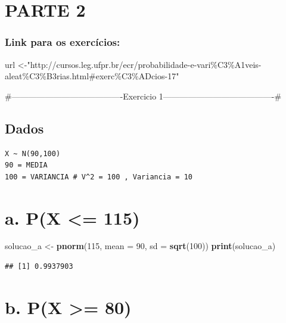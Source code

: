 \documentclass[
]{article}
\newenvironment{Shaded}{\begin{snugshade}}{\end{snugshade}}
\newcommand{\AttributeTok}[1]{\textcolor[rgb]{0.13,0.29,0.53}{#1}}
\newcommand{\DecValTok}[1]{\textcolor[rgb]{0.00,0.00,0.81}{#1}}
\newcommand{\FunctionTok}[1]{\textcolor[rgb]{0.13,0.29,0.53}{\textbf{#1}}}
\newcommand{\NormalTok}[1]{#1}
\newcommand{\OtherTok}[1]{\textcolor[rgb]{0.56,0.35,0.01}{#1}}
\newcommand{\StringTok}[1]{\textcolor[rgb]{0.31,0.60,0.02}{#1}}
\begin{document}
\section{PARTE 2}\label{parte-2}

\subsubsection{Link para os
exercícios:}\label{link-para-os-exercuxedcios}

\begin{Shaded}
\begin{Highlighting}[]
\NormalTok{url }\OtherTok{\textless{}{-}}\StringTok{"http://cursos.leg.ufpr.br/ecr/probabilidade{-}e{-}vari\%C3\%A1veis{-}aleat\%C3\%B3rias.html\#exerc\%C3\%ADcios{-}17"}
\end{Highlighting}
\end{Shaded}

\#----------------------------------------Exercicio
1----------------------------------------\#

\subsection{Dados}\label{dados}

\begin{verbatim}
X ~ N(90,100)
90 = MEDIA
100 = VARIANCIA # V^2 = 100 , Variancia = 10
\end{verbatim}

\section{a. P(X \textless= 115)}\label{a.-px-115}

\begin{Shaded}
\begin{Highlighting}[]
\NormalTok{solucao\_a }\OtherTok{\textless{}{-}} \FunctionTok{pnorm}\NormalTok{(}\DecValTok{115}\NormalTok{, }\AttributeTok{mean =} \DecValTok{90}\NormalTok{, }\AttributeTok{sd =} \FunctionTok{sqrt}\NormalTok{(}\DecValTok{100}\NormalTok{))}
\FunctionTok{print}\NormalTok{(solucao\_a)}
\end{Highlighting}
\end{Shaded}

\begin{verbatim}
## [1] 0.9937903
\end{verbatim}

\section{b. P(X \textgreater= 80)}\label{b.-px-80}
\end{document}

